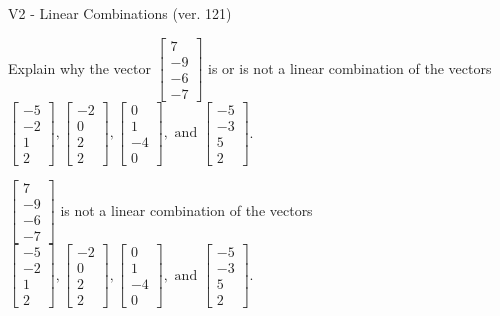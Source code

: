 \begin{exercise}
  \begin{exerciseTitle}V2 - Linear Combinations (ver. 121)\end{exerciseTitle}
  \begin{exerciseStatement}
    Explain why the vector \(\left[\begin{array}{c}
7 \\
-9 \\
-6 \\
-7
\end{array}\right]\)  is or is not a linear 
	combination of the vectors \(\left[\begin{array}{c}
-5 \\
-2 \\
1 \\
2
\end{array}\right] , \left[\begin{array}{c}
-2 \\
0 \\
2 \\
2
\end{array}\right] , \left[\begin{array}{c}
0 \\
1 \\
-4 \\
0
\end{array}\right] , \text{ and } \left[\begin{array}{c}
-5 \\
-3 \\
5 \\
2
\end{array}\right]\).
	


  \end{exerciseStatement}
  \begin{exerciseAnswer}
   \(\left[\begin{array}{c}
7 \\
-9 \\
-6 \\
-7
\end{array}\right]\) 
  	 is not  
	a linear combination of the vectors \(\left[\begin{array}{c}
-5 \\
-2 \\
1 \\
2
\end{array}\right] , \left[\begin{array}{c}
-2 \\
0 \\
2 \\
2
\end{array}\right] , \left[\begin{array}{c}
0 \\
1 \\
-4 \\
0
\end{array}\right] , \text{ and } \left[\begin{array}{c}
-5 \\
-3 \\
5 \\
2
\end{array}\right]\).


\end{exerciseAnswer}
\end{exercise}

